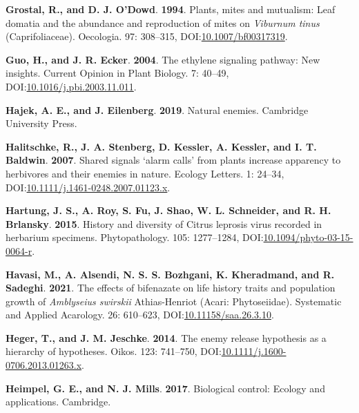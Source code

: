 \documentclass[12pt,final,CPage]{ufthesis}
\newlength{\cslhangindent}
\newenvironment{CSLReferences}[2] %
{%
	\setlength{\parindent}{0pt}
	\ifodd #1 \everypar{\setlength{\hangindent}{\cslhangindent}}\ignorespaces\fi
	\ifnum #2 > 0
	\setlength{\parskip}{#2\baselineskip}
	\fi
}%
{}
\begin{document}
{\begin{CSLReferences}{1}{0}
  \leavevmode{}%
  \textbf{Grostal, R., and D. J. O'Dowd}. \textbf{1994}. Plants, mites and mutualism: Leaf domatia and the abundance and reproduction of mites on {\emph{Viburnum tinus}} ({Caprifoliaceae}). Oecologia. 97: 308--315, DOI:\href{https://doi.org/10.1007/bf00317319}{10.1007/bf00317319}.

  \leavevmode{}%
  \textbf{Guo, H., and J. R. Ecker}. \textbf{2004}. The ethylene signaling pathway: New insights. Current Opinion in Plant Biology. 7: 40--49, DOI:\href{https://doi.org/10.1016/j.pbi.2003.11.011}{10.1016/j.pbi.2003.11.011}.

  \leavevmode{}%
  \textbf{Hajek, A. E., and J. Eilenberg}. \textbf{2019}. Natural enemies. Cambridge University Press.

  \leavevmode{}%
  \textbf{Halitschke, R., J. A. Stenberg, D. Kessler, A. Kessler, and I. T. Baldwin}. \textbf{2007}. Shared signals {\textendash}{`alarm calls'} from plants increase apparency to herbivores and their enemies in nature. Ecology Letters. 1: 24--34, DOI:\href{https://doi.org/10.1111/j.1461-0248.2007.01123.x}{10.1111/j.1461-0248.2007.01123.x}.

  \leavevmode{}%
  \textbf{Hartung, J. S., A. Roy, S. Fu, J. Shao, W. L. Schneider, and R. H. Brlansky}. \textbf{2015}. History and diversity of {Citrus leprosis virus} recorded in herbarium specimens. Phytopathology{\textregistered}. 105: 1277--1284, DOI:\href{https://doi.org/10.1094/phyto-03-15-0064-r}{10.1094/phyto-03-15-0064-r}.

  \leavevmode{}%
  \textbf{Havasi, M., A. Alsendi, N. S. S. Bozhgani, K. Kheradmand, and R. Sadeghi}. \textbf{2021}. The effects of bifenazate on life history traits and population growth of {\emph{Amblyseius swirskii}} {Athias-Henriot} ({Acari}: {Phytoseiidae}). Systematic and Applied Acarology. 26: 610--623, DOI:\href{https://doi.org/10.11158/saa.26.3.10}{10.11158/saa.26.3.10}.

  \leavevmode{}%
  \textbf{Heger, T., and J. M. Jeschke}. \textbf{2014}. The enemy release hypothesis as a hierarchy of hypotheses. Oikos. 123: 741--750, DOI:\href{https://doi.org/10.1111/j.1600-0706.2013.01263.x}{10.1111/j.1600-0706.2013.01263.x}.

  \leavevmode{}%
  \textbf{Heimpel, G. E., and N. J. Mills}. \textbf{2017}. Biological control: Ecology and applications. Cambridge.


\end{CSLReferences}}
\end{document}
